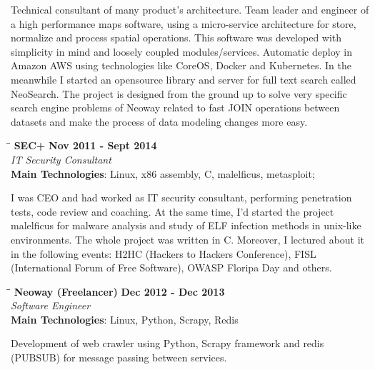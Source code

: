 \documentclass[margin]{res}
\begin{document}
\begin{resume}
    
  Technical consultant of many product's architecture. Team leader and engineer of a high performance maps software, using a micro-service architecture for store, normalize and process spatial operations.
This software was developed with simplicity in mind and loosely coupled modules/services. Automatic deploy in Amazon AWS using technologies like CoreOS, Docker and Kubernetes.
    In the meanwhile I started an opensource library and server for full text search called NeoSearch. The project is designed from the ground up to solve very specific search engine problems of Neoway related to fast JOIN operations between datasets and make the process of data modeling changes more easy.

\vspace{-0.1in}

\vspace{-0.1in}
   \begin{tabbing}
   \hspace{2.3in}\= \hspace{1.7in}\= \kill %
    \textbf{SEC+}    \>\>\textbf{Nov 2011 - Sept 2014}\\
    \textit{IT Security Consultant}\\        
    \textbf{Main Technologies}: Linux, x86 assembly, C, malelficus, metasploit;
   \end{tabbing}\vspace{-20pt}      %
    \vspace{2mm}
        I was CEO and had worked as IT security consultant, performing penetration tests, code review and coaching. At the same time, I’d started the project malelficus for malware analysis and study of ELF infection methods in unix-like environments. The whole project was written in C. Moreover, I lectured about it in the following events: H2HC (Hackers to Hackers Conference), FISL (International Forum of Free Software), OWASP Floripa Day and others.

\vspace{-0.1in}

   \begin{tabbing}
   \hspace{2.3in}\= \hspace{1.7in}\= \kill %
    \textbf{Neoway (Freelancer)}    \>\>\textbf{Dec 2012 - Dec 2013}\\
    \textit{Software Engineer}\\        
    \textbf{Main Technologies}: Linux, Python, Scrapy, Redis
   \end{tabbing}\vspace{-20pt}      %
    \vspace{2mm}
 Development of web crawler using Python, Scrapy framework and redis (PUBSUB) for message passing between services.
     


\end{resume}
\end{document}
